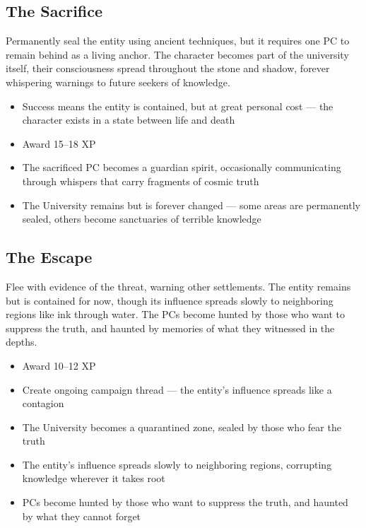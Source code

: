 \documentclass[11pt]{article}
\begin{document}
\subsection{The Sacrifice}

Permanently seal the entity using ancient techniques, but it requires one PC to remain behind as a living anchor. The character becomes part of the university itself, their consciousness spread throughout the stone and shadow, forever whispering warnings to future seekers of knowledge.

\begin{itemize}
\item Success means the entity is contained, but at great personal cost --- the character exists in a state between life and death
\item Award 15--18 XP
\item The sacrificed PC becomes a guardian spirit, occasionally communicating through whispers that carry fragments of cosmic truth
\item The University remains but is forever changed --- some areas are permanently sealed, others become sanctuaries of terrible knowledge
\end{itemize}

\subsection{The Escape}

Flee with evidence of the threat, warning other settlements. The entity remains but is contained for now, though its influence spreads slowly to neighboring regions like ink through water. The PCs become hunted by those who want to suppress the truth, and haunted by memories of what they witnessed in the depths.

\begin{itemize}
\item Award 10--12 XP
\item Create ongoing campaign thread --- the entity's influence spreads like a contagion
\item The University becomes a quarantined zone, sealed by those who fear the truth
\item The entity's influence spreads slowly to neighboring regions, corrupting knowledge wherever it takes root
\item PCs become hunted by those who want to suppress the truth, and haunted by what they cannot forget
\end{itemize}
\end{document}

